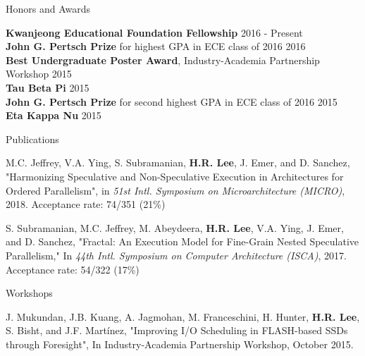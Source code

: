 \documentclass{resume} %
\begin{document}
\newpage


\begin{rSection}{Honors and Awards}

{\bf Kwanjeong Educational Foundation Fellowship} \hfill {2016 - Present} \\
{\bf John G. Pertsch Prize} for highest GPA in ECE class of 2016 \hfill{2016} \\
{\bf Best Undergraduate Poster Award}, Industry-Academia Partnership Workshop \hfill {2015} \\
{\bf Tau Beta Pi} \hfill {2015} \\
{\bf John G. Pertsch Prize} for second highest GPA in ECE class of 2016 \hfill {2015} \\
{\bf Eta Kappa Nu} \hfill {2015} 

\end{rSection}


\begin{rSection}{Publications}

M.C. Jeffrey, V.A. Ying, S. Subramanian, {\bf H.R. Lee}, J. Emer, and D. Sanchez,
"Harmonizing Speculative and Non-Speculative Execution in Architectures for Ordered Parallelism",
in \textit{51st Intl. Symposium on Microarchitecture (MICRO)}, 2018. Acceptance rate: 74/351 (21\%)

S. Subramanian, M.C. Jeffrey, M. Abeydeera, {\bf H.R. Lee}, V.A. Ying, J. Emer, and D. Sanchez, 
"Fractal: An Execution Model for Fine-Grain Nested Speculative Parallelism,"
In \textit{44th Intl. Symposium on Computer Architecture (ISCA)}, 2017. Acceptance rate: 54/322 (17\%)

\end{rSection}


\begin{rSection}{Workshops}

J. Mukundan, J.B. Kuang, A. Jagmohan, M. Franceschini, H. Hunter, {\bf H.R. Lee}, S. Bisht, and J.F. Martínez, "Improving I/O Scheduling in FLASH-based SSDs through Foresight", In Industry-Academia Partnership Workshop, October 2015.

\end{rSection}
\end{document}
